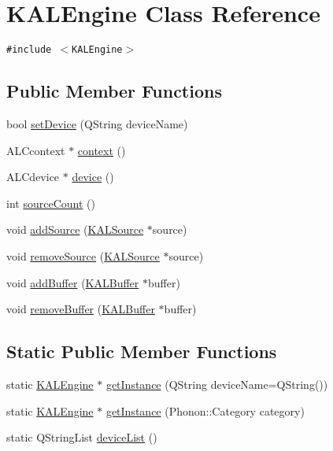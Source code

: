 \hypertarget{class_k_a_l_engine}{
\section{KALEngine Class Reference}
\label{class_k_a_l_engine}
}
{\tt \#include $<$KALEngine$>$}

\subsection*{Public Member Functions}
\begin{CompactItemize}
\item 
bool \hyperlink{class_k_a_l_engine_697ace280196c559fc54f9e4ad99945b}{setDevice} (QString deviceName)
\item 
ALCcontext $\ast$ \hyperlink{class_k_a_l_engine_cfe63944ffe4ee4437eae9c3e7f0d682}{context} ()
\item 
ALCdevice $\ast$ \hyperlink{class_k_a_l_engine_2b3a425e09e9a1a8dcc0756ff0226152}{device} ()
\item 
int \hyperlink{class_k_a_l_engine_0f2cee92e67b65ee5af5d6e3db0a1848}{sourceCount} ()
\item 
void \hyperlink{class_k_a_l_engine_133eb302b80d87fd3bcfff7e07017d1b}{addSource} (\hyperlink{class_k_a_l_source}{KALSource} $\ast$source)
\item 
void \hyperlink{class_k_a_l_engine_4399d5d8e66ee8dba068cb9080d244cc}{removeSource} (\hyperlink{class_k_a_l_source}{KALSource} $\ast$source)
\item 
void \hyperlink{class_k_a_l_engine_c702ef3fb20c3dae650415f58e095b0f}{addBuffer} (\hyperlink{class_k_a_l_buffer}{KALBuffer} $\ast$buffer)
\item 
void \hyperlink{class_k_a_l_engine_6a5cc953f187197973e2c9e6235b2c27}{removeBuffer} (\hyperlink{class_k_a_l_buffer}{KALBuffer} $\ast$buffer)
\end{CompactItemize}
\subsection*{Static Public Member Functions}
\begin{CompactItemize}
\item 
static \hyperlink{class_k_a_l_engine}{KALEngine} $\ast$ \hyperlink{class_k_a_l_engine_6734e54cc206f432d55d5cc9e42a8f50}{getInstance} (QString deviceName=QString())
\item 
static \hyperlink{class_k_a_l_engine}{KALEngine} $\ast$ \hyperlink{class_k_a_l_engine_a9802c767f0efe5685b0cc8af742343d}{getInstance} (Phonon::Category category)
\item 
static QStringList \hyperlink{class_k_a_l_engine_9141fde32ddd7c6e7e9e2a0dc5d5375b}{deviceList} ()
\end{CompactItemize}


